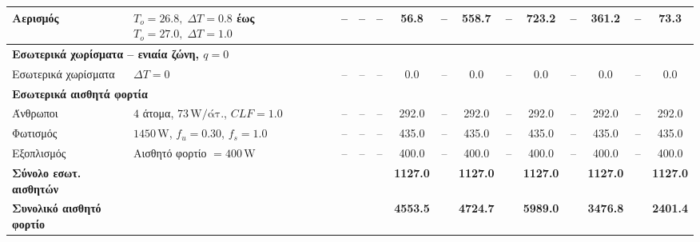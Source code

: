 \documentclass[12pt,a4paper]{article}
\begin{document}
\begin{landscape}
\begin{table}[H]
{\begin{tabular}{llcc*{5}{cc}}
Αερισμός & \(T_o=26.8,\; \Delta T=0.8\) έως \(T_o=27.0,\; \Delta T=1.0\) & -- & -- & -- & 56.8 & -- & 558.7 & -- & 723.2 & -- & 361.2 & -- & 73.3 \\
\midrule
\multicolumn{14}{l}{\textbf{Εσωτερικά χωρίσματα -- ενιαία ζώνη, \(q=0\)}} \\
Εσωτερικά χωρίσματα & \(\Delta T = 0\) & -- & -- & -- & 0.0 & -- & 0.0 & -- & 0.0 & -- & 0.0 & -- & 0.0 \\
\midrule
\multicolumn{14}{l}{\textbf{Εσωτερικά αισθητά φορτία}} \\
Άνθρωποι & \(4\) άτομα, \(73\,\mathrm{W/άτ.}\), \(CLF=1.0\) & -- & -- & -- & 292.0 & -- & 292.0 & -- & 292.0 & -- & 292.0 & -- & 292.0 \\
Φωτισμός & \(1450\,\mathrm{W}\), \(f_u=0.30\), \(f_s=1.0\) & -- & -- & -- & 435.0 & -- & 435.0 & -- & 435.0 & -- & 435.0 & -- & 435.0 \\
Εξοπλισμός & Αισθητό φορτίο \(=400\,\mathrm{W}\) & -- & -- & -- & 400.0 & -- & 400.0 & -- & 400.0 & -- & 400.0 & -- & 400.0 \\
\textbf{Σύνολο εσωτ. αισθητών} &  &  &  &  & \textbf{1127.0} &  & \textbf{1127.0} &  & \textbf{1127.0} &  & \textbf{1127.0} &  & \textbf{1127.0} \\
\midrule
\textbf{Συνολικό αισθητό φορτίο} &  &  &  &  & \textbf{4553.5} &  & \textbf{4724.7} &  & \textbf{5989.0} &  & \textbf{3476.8} &  & \textbf{2401.4} \\
\bottomrule
\end{tabular}%
}
\end{table}
\end{landscape}
\end{document}
